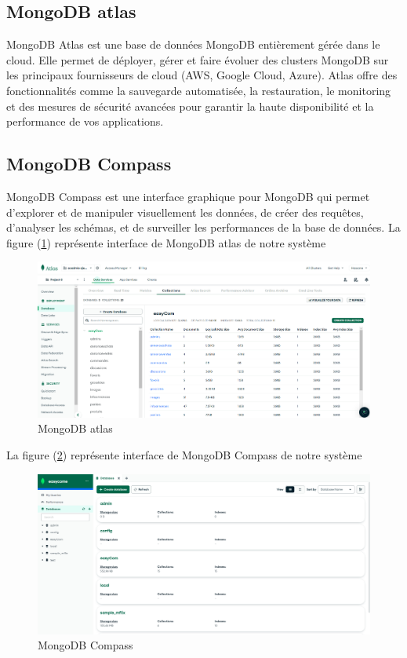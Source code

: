 \documentclass[edit,12pt,a4paper,ChapStyle,oneside,doubleinterligne]{report}
\begin{document}
\subsection{MongoDB atlas}
MongoDB Atlas est une base de données MongoDB entièrement gérée dans le cloud. Elle permet de déployer, gérer et faire évoluer des clusters MongoDB sur les principaux fournisseurs de cloud (AWS, Google Cloud, Azure). Atlas offre des fonctionnalités comme la sauvegarde automatisée, la restauration, le monitoring et des mesures de sécurité avancées pour garantir la haute disponibilité et la performance de vos applications.\cite{atlas}
\subsection{MongoDB Compass }
MongoDB Compass est une interface graphique pour MongoDB qui permet d'explorer et de manipuler visuellement les données, de créer des requêtes, d'analyser les schémas, et de surveiller les performances de la base de données.
\newline \phantom{hassane} \newline
La figure (\ref{fig:stock}) représente interface de MongoDB atlas de notre système 
\begin{figure} [H]
    \centering
    \includegraphics[width=1\textwidth]{images/monogatlas.png}
    \caption{MongoDB atlas}
    \label{fig:stock}
\end{figure}
La figure (\ref{fig:compass}) représente interface de MongoDB Compass de notre système 
\begin{figure} [H]
    \centering
    \includegraphics[width=1\textwidth]{images/mongodb db.png}
    \caption{MongoDB Compass}
    \label{fig:compass}
\end{figure}
\end{document}
